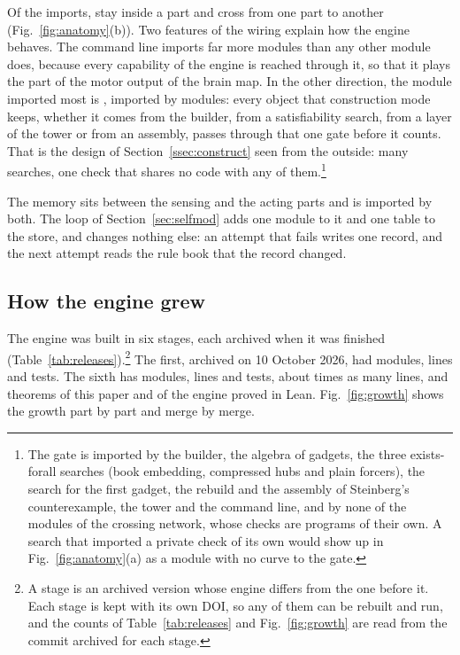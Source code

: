 Of the \brainImports{} imports, \brainWithin{} stay inside a part and \brainBetween{} cross from one part to another (Fig.~\ref{fig:anatomy}(b)). Two features of the wiring explain how the engine behaves. The command line imports far more modules than any other module does, because every capability of the engine is reached through it, so that it plays the part of the motor output of the brain map. In the other direction, the module imported most is \texttt{\brainHub}, imported by \brainHubIn{} modules: every object that construction mode keeps, whether it comes from the builder, from a satisfiability search, from a layer of the tower or from an assembly, passes through that one gate before it counts. That is the design of Section~\ref{ssec:construct} seen from the outside: many searches, one check that shares no code with any of them.\footnote{The gate is imported by the builder, the algebra of gadgets, the three exists-forall searches (book embedding, compressed hubs and plain forcers), the search for the first gadget, the rebuild and the assembly of Steinberg's counterexample, the tower and the command line, and by none of the modules of the crossing network, whose checks are programs of their own. A search that imported a private check of its own would show up in Fig.~\ref{fig:anatomy}(a) as a module with no curve to the gate.}

The memory sits between the sensing and the acting parts and is imported by both. The loop of Section~\ref{sec:selfmod} adds one module to it and one table to the store, and changes nothing else: an attempt that fails writes one record, and the next attempt reads the rule book that the record changed.



\subsection{How the engine grew}\label{ssec:growth}

The engine was built in six stages, each archived when it was finished (Table~\ref{tab:releases}).\footnote{A stage is an archived version whose engine differs from the one before it. Each stage is kept with its own DOI, so any of them can be rebuilt and run, and the counts of Table~\ref{tab:releases} and Fig.~\ref{fig:growth} are read from the commit archived for each stage.} The first, archived on 10 October 2026, had \brainFirstModules{} modules, \brainFirstLines{} lines and \brainFirstTests{} tests. The sixth has \brainModules{} modules, \brainLines{} lines and \brainTests{} tests, about \brainGrowth{} times as many lines, and \brainLeanPaper{} theorems of this paper and \brainLeanEngine{} of the engine proved in Lean. Fig.~\ref{fig:growth} shows the growth part by part and merge by merge.

